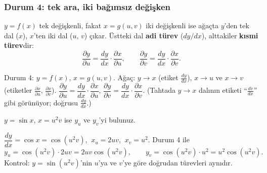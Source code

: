 \subsubsection{Durum 4: tek ara, iki bağımsız değişken}
$y=f(x)$ tek değişkenli, fakat $x=g(u,v)$ iki değişkenli ise ağaçta $y$'den tek dal ($x$), $x$'ten iki dal ($u$, $v$)
çıkar. Üstteki dal \textbf{adi türev} ($dy/dx$), alttakiler \textbf{kısmi türev}dir:
\[
\frac{\partial y}{\partial u}=\frac{dy}{dx}\cdot\frac{\partial x}{\partial u},\qquad
\frac{\partial y}{\partial v}=\frac{dy}{dx}\cdot\frac{\partial x}{\partial v}.
\]

\begin{center}
\end{center}

\begin{tahta}
Durum 4: $y=f(x)$, $x=g(u,v)$. Ağaç: $y\to x$ (etiket $\frac{dy}{dx}$), $x\to u$ ve $x\to v$ (etiketler
$\frac{\partial x}{\partial u}$, $\frac{\partial x}{\partial v}$).
$\dfrac{\partial y}{\partial u}=\dfrac{dy}{dx}\cdot\dfrac{\partial x}{\partial u}$,\quad
$\dfrac{\partial y}{\partial v}=\dfrac{dy}{dx}\cdot\dfrac{\partial x}{\partial v}$.
(Tahtada $y\to x$ dalının etiketi ``$\frac{dv}{dx}$'' gibi görünüyor; doğrusu $\frac{dy}{dx}$.)
\end{tahta}

\begin{soru}
$y=\sin x$, $x=u^2v$ ise $y_u$ ve $y_v$'yi bulunuz.
\end{soru}
\begin{cevap}
$\dfrac{dy}{dx}=\cos x=\cos(u^2v)$, $\ x_u=2uv$, $\ x_v=u^2$. Durum 4 ile
\[
y_u=\cos(u^2v)\cdot2uv=\boxed{2uv\cos(u^2v)},\qquad y_v=\cos(u^2v)\cdot u^2=\boxed{u^2\cos(u^2v)}.
\]
Kontrol: $y=\sin(u^2v)$'nin $u$'ya ve $v$'ye göre doğrudan türevleri aynıdır.
\end{cevap}

